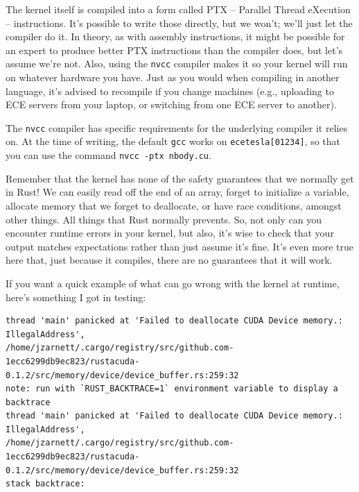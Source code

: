 The kernel itself is compiled into a form called PTX -- Parallel Thread eXecution -- instructions. It's possible to write those directly, but we won't; we'll just let the compiler do it. In theory, as with assembly instructions, it might be possible for an expert to produce better PTX instructions than the compiler does, but let's assume we're not. Also, using the \texttt{nvcc} compiler makes it so your kernel will run on whatever hardware you have. Just as you would when compiling in another language, it's advised to recompile if you change machines (e.g., uploading to ECE servers from your laptop, or switching from one ECE server to another).

The \texttt{nvcc} compiler has specific requirements for the underlying compiler it relies on. At the time of writing, the default \texttt{gcc} works on \texttt{ecetesla[01234]}, so that you can use the command \texttt{nvcc -ptx nbody.cu}.

Remember that the kernel has none of the safety guarantees that we normally get in Rust! We can easily read off the end of an array, forget to initialize a variable, allocate memory that we forget to deallocate, or have race conditions, amongst other things. All things that Rust normally prevents. So, not only can you encounter runtime errors in your kernel, but also, it's wise to check that your output matches expectations rather than just assume it's fine. It's even more true here that, just because it compiles, there are no guarantees that it will work.

\newpage
If you want a quick example of what can go wrong with the kernel at runtime, here's something I got in testing:
{\scriptsize
\begin{verbatim}
thread 'main' panicked at 'Failed to deallocate CUDA Device memory.: IllegalAddress', 
/home/jzarnett/.cargo/registry/src/github.com-1ecc6299db9ec823/rustacuda-0.1.2/src/memory/device/device_buffer.rs:259:32
note: run with `RUST_BACKTRACE=1` environment variable to display a backtrace
thread 'main' panicked at 'Failed to deallocate CUDA Device memory.: IllegalAddress', 
/home/jzarnett/.cargo/registry/src/github.com-1ecc6299db9ec823/rustacuda-0.1.2/src/memory/device/device_buffer.rs:259:32
stack backtrace:
\end{verbatim}
}

